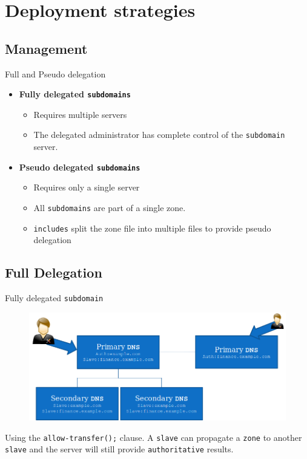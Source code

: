 \documentclass[xcolor=table]{beamer}
\begin{document}
\section{Deployment strategies}
\subsection{Management}
\begin{frame}{Full and Pseudo delegation}
  \begin{itemize}
    \item \textbf{Fully delegated \texttt{subdomains}}
      \begin{itemize}
        \item Requires multiple servers
        \item The delegated administrator has complete control of the \texttt{subdomain} server.
      \end{itemize}
    \item \textbf{Pseudo delegated \texttt{subdomains}}
      \begin{itemize}
        \item Requires only a single server
        \item All \texttt{subdomains} are part of a single zone.
        \item \texttt{includes} split the zone file into multiple files to provide pseudo delegation 
      \end{itemize}
  \end{itemize}
\end{frame}

\subsection{Full Delegation}
\begin{frame}{Fully delegated \texttt{subdomain}}
  \begin{figure}
    \begin{center}
      \includegraphics[width=1\linewidth]{FullyDelegated.png}
    \end{center}
  \end{figure}
  \begin{tcolorbox}
    \begin{center}
      \scriptsize Using the \texttt{allow-transfer();} clause. A \texttt{slave} can propagate a \texttt{zone} to another \texttt{slave} and the server will still provide \texttt{authoritative} results.
    \end{center}
  \end{tcolorbox}
\end{frame}
\end{document}
